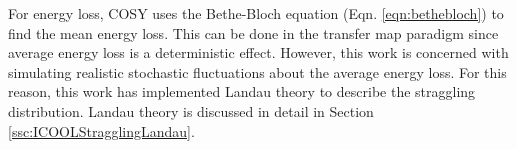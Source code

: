  \label{sec:COSYStraggling}\par
For energy loss, COSY uses the Bethe-Bloch equation (Eqn. \ref{eqn:bethebloch}) to find the mean energy loss. This can be done in the transfer map paradigm since average energy loss is a deterministic effect. However, this work is concerned with simulating realistic stochastic fluctuations about the average energy loss. For this reason, this work has implemented Landau theory \cite{landau} to describe the straggling distribution. Landau theory is discussed in detail in Section \ref{ssc:ICOOLStragglingLandau}. 

